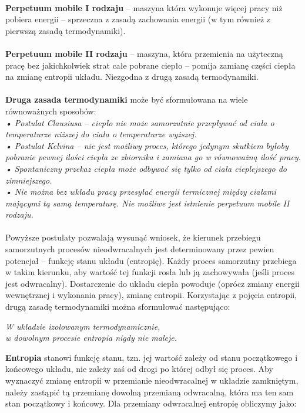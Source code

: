 \documentclass[12pt,a4paper,openright]{report} %
\begin{document}
\\
\textbf{Perpetuum mobile I rodzaju} – maszyna która wykonuje więcej pracy niż pobiera energii – sprzeczna z zasadą zachowania energii (w tym również z pierwszą zasadą termodynamiki).\\
\\
\textbf{Perpetuum mobile II rodzaju} – maszyna, która przemienia na użyteczną pracę bez jakichkolwiek strat całe pobrane ciepło – pomija zamianę części ciepła na zmianę entropii układu. Niezgodna z drugą zasadą termodynamiki. \\
\\
\textbf{Druga zasada termodynamiki} może być sformułowana na wiele równoważnych sposobów:\\
\textit{• Postulat Clausiusa – ciepło nie może samorzutnie przepływać od ciała o temperaturze niższej do ciała o temperaturze wyższej.}\\
\textit{• Postulat Kelvina – nie jest możliwy proces, którego jedynym skutkiem byłoby pobranie pewnej ilości ciepła ze zbiornika i zamiana go w równoważną ilość pracy.}\\
\textit{• Spontaniczny przekaz ciepła może odbywać się tylko od ciała cieplejszego do zimniejszego.}\\
\textit{• Nie można bez wkładu pracy przesyłać energii termicznej między ciałami mającymi tą samą temperaturę. Nie możliwe jest istnienie perpetuum mobile II rodzaju.}\\
%
\\
Powyższe postulaty pozwalają wysunąć wniosek, że kierunek przebiegu samorzutnych procesów nieodwracalnych jest determinowany przez pewien potencjał – funkcję stanu układu (entropię). Każdy proces samorzutny przebiega w takim kierunku, aby wartość tej funkcji rosła lub ją zachowywała (jeśli proces jest odwracalny). Dostarczenie do układu ciepła powoduje (oprócz zmiany energii wewnętrznej i wykonania pracy), zmianę entropii. Korzystając z pojęcia entropii, drugą zasadę termodynamiki można sformułować następująco:
%
\begin{center}
\textit{W układzie izolowanym termodynamicznie, \\ w dowolnym procesie 
entropia nigdy nie maleje.}
\end{center}
%
\textbf{Entropia} stanowi funkcję stanu, tzn. jej wartość zależy od stanu początkowego i końcowego układu, nie zależy zaś od drogi po której odbył się proces.
Aby wyznaczyć zmianę entropii w przemianie nieodwracalnej w układzie zamkniętym, należy zastąpić tą przemianę dowolną przemianą odwracalną, która ma ten sam stan początkowy i końcowy. Dla przemiany odwracalnej entropię obliczymy jako:
\end{document}
